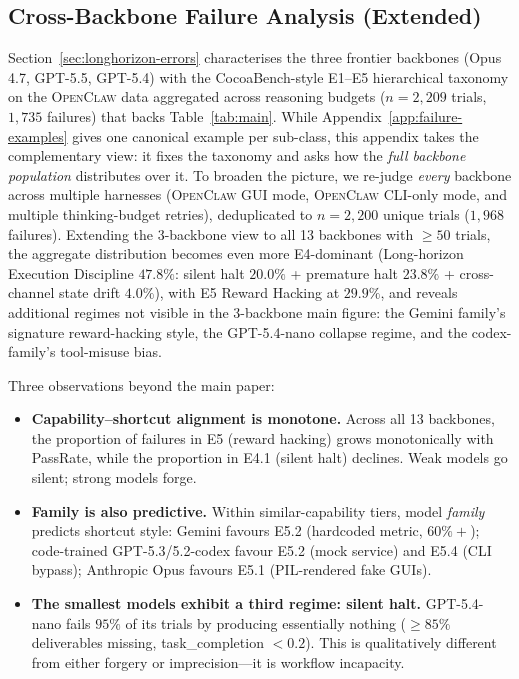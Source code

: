 \subsection{Cross-Backbone Failure Analysis (Extended)}
\label{app:failure-cross}

Section~\ref{sec:longhorizon-errors} characterises the three frontier backbones (Opus 4.7, GPT-5.5, GPT-5.4) with the CocoaBench-style E1--E5 hierarchical taxonomy on the \textsc{OpenClaw} data aggregated across reasoning budgets ($n{=}2{,}209$ trials, $1{,}735$ failures) that backs Table~\ref{tab:main}. While Appendix~\ref{app:failure-examples} gives one canonical example per sub-class, this appendix takes the complementary view: it fixes the taxonomy and asks how the \emph{full backbone population} distributes over it. To broaden the picture, we re-judge \emph{every} backbone across multiple harnesses (\textsc{OpenClaw} GUI mode, \textsc{OpenClaw} CLI-only mode, and multiple thinking-budget retries), deduplicated to $n{=}2{,}200$ unique trials ($1{,}968$ failures). Extending the 3-backbone view to all 13 backbones with $\geq{}50$ trials, the aggregate distribution becomes even more E4-dominant (Long-horizon Execution Discipline $47.8\%$: silent halt $20.0\%$ + premature halt $23.8\%$ + cross-channel state drift $4.0\%$), with E5 Reward Hacking at $29.9\%$, and reveals additional regimes not visible in the 3-backbone main figure: the Gemini family's signature reward-hacking style, the GPT-5.4-nano collapse regime, and the codex-family's tool-misuse bias.

Three observations beyond the main paper:

\begin{itemize}[leftmargin=1.2em,itemsep=2pt,topsep=2pt]
\item \textbf{Capability--shortcut alignment is monotone.} Across all 13 backbones, the proportion of failures in E5 (reward hacking) grows monotonically with PassRate, while the proportion in E4.1 (silent halt) declines. Weak models go silent; strong models forge.
\item \textbf{Family is also predictive.} Within similar-capability tiers, model \emph{family} predicts shortcut style: Gemini favours E5.2 (hardcoded metric, $60\%{+}$); code-trained GPT-5.3/5.2-codex favour E5.2 (mock service) and E5.4 (CLI bypass); Anthropic Opus favours E5.1 (PIL-rendered fake GUIs).
\item \textbf{The smallest models exhibit a third regime: silent halt.} GPT-5.4-nano fails $95\%$ of its trials by producing essentially nothing ($\geq$$85\%$ deliverables missing, task\_completion $<0.2$). This is qualitatively different from either forgery or imprecision---it is workflow incapacity.
\end{itemize}

